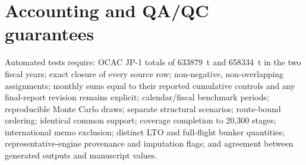 \section{Accounting and QA/QC guarantees}

Automated tests require: OCAC JP-1 totals of \SI{633879}{\tonne} and
\SI{658334}{\tonne} in the two fiscal years; exact closure of every source row; non-negative,
non-overlapping assignments; monthly sums equal to their reported cumulative controls and any
final-report revision remains explicit; calendar/fiscal
benchmark periods; reproducible Monte Carlo draws; separate structural scenarios; route-bound
ordering; identical common support; coverage completion to 20,300 stages; international memo
exclusion; distinct LTO and full-flight bunker quantities; representative-engine provenance and
imputation flags; and agreement between generated outputs and manuscript values.

